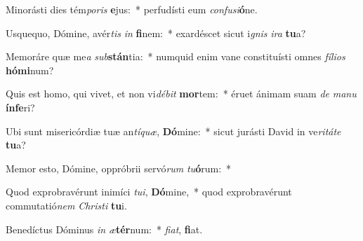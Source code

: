 \item Minorásti dies tém\textit{po}\textit{ris} \textbf{e}jus:~* perfudísti eum \textit{con}\textit{fu}\textit{si}\textbf{ó}ne.
\item Usquequo, Dómine, avér\textit{tis} \textit{in} \textbf{fi}nem:~* exardéscet sicut i\textit{gnis} \textit{i}\textit{ra} \textbf{tu}a?
\item Memoráre quæ me\textit{a} \textit{sub}\textbf{stán}tia:~* numquid enim vane constituísti omnes \textit{fí}\textit{li}\textit{os} \textbf{hó}\textbf{mi}num?
\item Quis est homo, qui vivet, et non vi\textit{dé}\textit{bit} \textbf{mor}tem:~* éruet ánimam suam \textit{de} \textit{ma}\textit{nu} \textbf{ín}\textbf{fe}ri?
\item Ubi sunt misericórdiæ tuæ an\textit{tí}\textit{quæ}, \textbf{Dó}mine:~* sicut jurásti David in ve\textit{ri}\textit{tá}\textit{te} \textbf{tu}a?
\item Memor esto, Dómine, oppróbrii servó\textit{rum} \textit{tu}\textbf{ó}rum:~* 
\item Quod exprobravérunt inimíci \textit{tu}\textit{i}, \textbf{Dó}mine,~* quod exprobravérunt commutatió\textit{nem} \textit{Chris}\textit{ti} \textbf{tu}i.
\item Benedíctus Dóminus \textit{in} \textit{æ}\textbf{tér}num:~* \textit{fi}\textit{at}, \textbf{fi}at.
